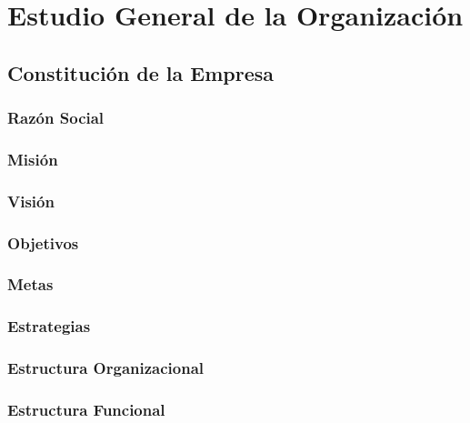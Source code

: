 \chapter{Estudio General de la Organizaci\'on}
\section{Constituci\'on de la Empresa}
\subsection{Raz\'on Social}

\subsection{Misi\'on}

\subsection{Visi\'on}

\subsection{Objetivos}

\subsection{Metas}

\subsection{Estrategias}

\subsection{Estructura Organizacional}

\subsection{Estructura Funcional}